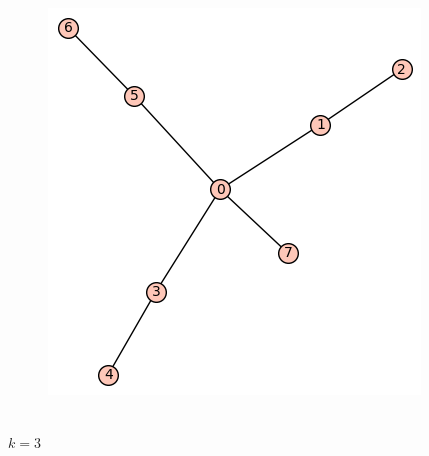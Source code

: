 \documentclass[12pt, a4paper]{article}
\begin{document}
\begin{figure}[h!]
\centering
\includegraphics[width=\linewidth]{t-44}
\end{figure} \\

$k=3$
\end{document}
